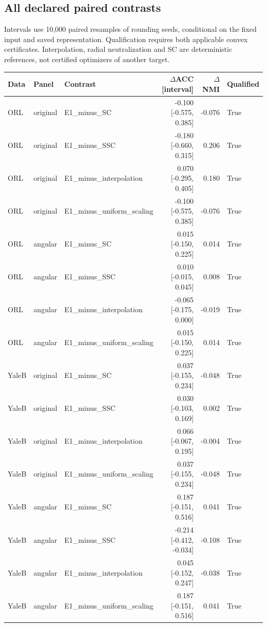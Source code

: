 \subsection{All declared paired contrasts}
Intervals use 10,000 paired resamples of rounding seeds, conditional on the fixed input and saved representation. Qualification requires both applicable convex certificates. Interpolation, radial neutralization and SC are deterministic references, not certified optimizers of another target.
\begingroup\scriptsize\setlength{\tabcolsep}{3pt}
\begin{longtable}{llp{.28\linewidth}rrl}\toprule Data & Panel & Contrast & $\Delta$ACC [interval] & $\Delta$NMI & Qualified\\\midrule\endhead
ORL & original & E1\_minus\_SC & -0.100 [-0.575, 0.385] & -0.076 & True\\
ORL & original & E1\_minus\_SSC & -0.180 [-0.660, 0.315] & 0.206 & True\\
ORL & original & E1\_minus\_interpolation & 0.070 [-0.295, 0.405] & 0.180 & True\\
ORL & original & E1\_minus\_uniform\_scaling & -0.100 [-0.575, 0.385] & -0.076 & True\\
ORL & angular & E1\_minus\_SC & 0.015 [-0.150, 0.225] & 0.014 & True\\
ORL & angular & E1\_minus\_SSC & 0.010 [-0.015, 0.045] & 0.008 & True\\
ORL & angular & E1\_minus\_interpolation & -0.065 [-0.175, 0.000] & -0.019 & True\\
ORL & angular & E1\_minus\_uniform\_scaling & 0.015 [-0.150, 0.225] & 0.014 & True\\
YaleB & original & E1\_minus\_SC & 0.037 [-0.155, 0.234] & -0.048 & True\\
YaleB & original & E1\_minus\_SSC & 0.030 [-0.103, 0.169] & 0.002 & True\\
YaleB & original & E1\_minus\_interpolation & 0.066 [-0.067, 0.195] & -0.004 & True\\
YaleB & original & E1\_minus\_uniform\_scaling & 0.037 [-0.155, 0.234] & -0.048 & True\\
YaleB & angular & E1\_minus\_SC & 0.187 [-0.151, 0.516] & 0.041 & True\\
YaleB & angular & E1\_minus\_SSC & -0.214 [-0.412, -0.034] & -0.108 & True\\
YaleB & angular & E1\_minus\_interpolation & 0.045 [-0.152, 0.247] & -0.038 & True\\
YaleB & angular & E1\_minus\_uniform\_scaling & 0.187 [-0.151, 0.516] & 0.041 & True\\

\end{longtable}
